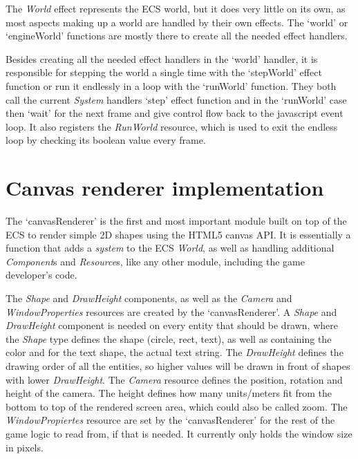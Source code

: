 The \textit{World} effect represents the ECS world, but it does very little on its own, as most aspects making up a world are handled by their own effects. The `world' or `engineWorld' functions are mostly there to create all the needed effect handlers.

Besides creating all the needed effect handlers in the `world' handler, it is responsible for stepping the world a single time with the `stepWorld' effect function or run it endlessly in a loop with the `runWorld' function. They both call the current \textit{System} handlers `step' effect function and in the `runWorld' case then `wait' for the next frame and give control flow back to the javascript event loop. It also registers the \textit{RunWorld} resource, which is used to exit the endless loop by checking its boolean value every frame.

\section{Canvas renderer implementation}

The `canvasRenderer' is the first and most important module built on top of the ECS to render simple 2D shapes using the HTML5 canvas API. It is essentially a function that adds a \textit{system} to the ECS \textit{World}, as well as handling additional \textit{Component}s and \textit{Resource}s, like any other module, including the game developer's code.

The \textit{Shape} and \textit{DrawHeight} components, as well as the \textit{Camera} and \textit{WindowProperties} resources are created by the `canvasRenderer'. A \textit{Shape} and \textit{DrawHeight} component is needed on every entity that should be drawn, where the \textit{Shape} type defines the shape (circle, rect, text), as well as containing the color and for the text shape, the actual text string. The \textit{DrawHeight} defines the drawing order of all the entities, so higher values will be drawn in front of shapes with lower \textit{DrawHeight}. The \textit{Camera} resource defines the position, rotation and height of the camera. The height defines how many units/meters fit from the bottom to top of the rendered screen area, which could also be called zoom. The \textit{WindowPropiertes} resource are set by the `canvasRenderer' for the rest of the game logic to read from, if that is needed. It currently only holds the window size in pixels.

